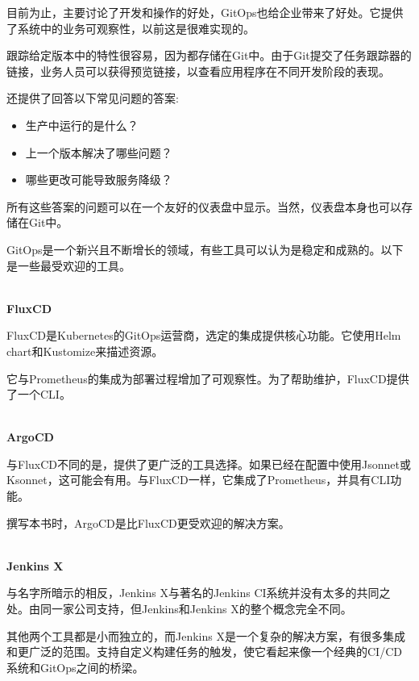 目前为止，主要讨论了开发和操作的好处，GitOps也给企业带来了好处。它提供了系统中的业务可观察性，以前这是很难实现的。

跟踪给定版本中的特性很容易，因为都存储在Git中。由于Git提交了任务跟踪器的链接，业务人员可以获得预览链接，以查看应用程序在不同开发阶段的表现。

还提供了回答以下常见问题的答案:

\begin{itemize}
\item 
生产中运行的是什么？

\item 
上一个版本解决了哪些问题？

\item 
哪些更改可能导致服务降级？
\end{itemize}

所有这些答案的问题可以在一个友好的仪表盘中显示。当然，仪表盘本身也可以存储在Git中。


GitOps是一个新兴且不断增长的领域，有些工具可以认为是稳定和成熟的。以下是一些最受欢迎的工具。

\hspace*{\fill} \\ %
\noindent
\textbf{FluxCD}

FluxCD是Kubernetes的GitOps运营商，选定的集成提供核心功能。它使用Helm chart和Kustomize来描述资源。

它与Prometheus的集成为部署过程增加了可观察性。为了帮助维护，FluxCD提供了一个CLI。

\hspace*{\fill} \\ %
\noindent
\textbf{ArgoCD}

与FluxCD不同的是，提供了更广泛的工具选择。如果已经在配置中使用Jsonnet或Ksonnet，这可能会有用。与FluxCD一样，它集成了Prometheus，并具有CLI功能。

撰写本书时，ArgoCD是比FluxCD更受欢迎的解决方案。

\hspace*{\fill} \\ %
\noindent
\textbf{Jenkins X}

与名字所暗示的相反，Jenkins X与著名的Jenkins CI系统并没有太多的共同之处。由同一家公司支持，但Jenkins和Jenkins X的整个概念完全不同。

其他两个工具都是小而独立的，而Jenkins X是一个复杂的解决方案，有很多集成和更广泛的范围。支持自定义构建任务的触发，使它看起来像一个经典的CI/CD系统和GitOps之间的桥梁。








